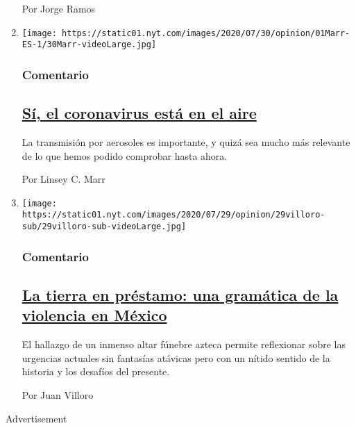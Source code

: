 \begin{enumerate}
  Por Jorge Ramos
\item
  \texttt{[image: https://static01.nyt.com/images/2020/07/30/opinion/01Marr-ES-1/30Marr-videoLarge.jpg]}

  \hypertarget{comentario-2}{%
  \subsubsection{Comentario}\label{comentario-2}}

  \hypertarget{suxed-el-coronavirus-estuxe1-en-el-aire}{%
  \subsection{\texorpdfstring{\href{/es/2020/08/01/espanol/opinion/coronavirus-aire.html}{Sí,
  el coronavirus está en el
  aire}}{Sí, el coronavirus está en el aire}}\label{suxed-el-coronavirus-estuxe1-en-el-aire}}

  La transmisión por aerosoles es importante, y quizá sea mucho más
  relevante de lo que hemos podido comprobar hasta ahora.

  Por Linsey C. Marr
\item
  \texttt{[image: https://static01.nyt.com/images/2020/07/29/opinion/29villoro-sub/29villoro-sub-videoLarge.jpg]}

  \hypertarget{comentario-3}{%
  \subsubsection{Comentario}\label{comentario-3}}

  \hypertarget{la-tierra-en-pruxe9stamo-una-gramuxe1tica-de-la-violencia-en-muxe9xico}{%
  \subsection{\texorpdfstring{\href{/es/2020/07/30/espanol/opinion/aztecas-violencia-narco-amlo.html}{La
  tierra en préstamo: una gramática de la violencia en
  México}}{La tierra en préstamo: una gramática de la violencia en México}}\label{la-tierra-en-pruxe9stamo-una-gramuxe1tica-de-la-violencia-en-muxe9xico}}

  El hallazgo de un inmenso altar fúnebre azteca permite reflexionar
  sobre las urgencias actuales sin fantasías atávicas pero con un nítido
  sentido de la historia y los desafíos del presente.

  Por Juan Villoro
\end{enumerate}

Advertisement

